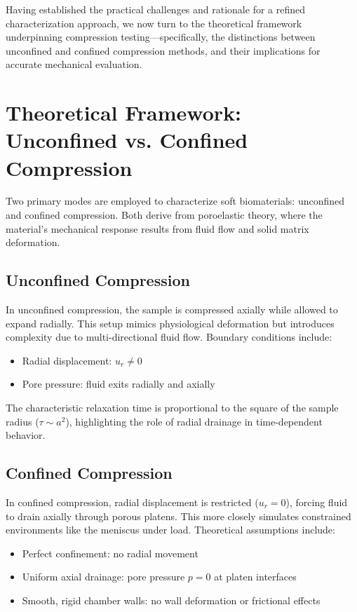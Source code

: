 Having established the practical challenges and rationale for a refined characterization approach, we now turn to the theoretical framework underpinning compression testing—specifically, the distinctions between unconfined and confined compression methods, and their implications for accurate mechanical evaluation.

\section{Theoretical Framework: Unconfined vs. Confined Compression}

Two primary modes are employed to characterize soft biomaterials: unconfined and confined compression. Both derive from poroelastic theory, where the material's mechanical response results from fluid flow and solid matrix deformation.

\subsection{Unconfined Compression}

In unconfined compression, the sample is compressed axially while allowed to expand radially. This setup mimics physiological deformation but introduces complexity due to multi-directional fluid flow. Boundary conditions include:
\begin{itemize}
    \item Radial displacement: $u_r \neq 0$
    \item Pore pressure: fluid exits radially and axially
\end{itemize}

The characteristic relaxation time is proportional to the square of the sample radius ($\tau \sim a^2$), highlighting the role of radial drainage in time-dependent behavior.

\subsection{Confined Compression}

In confined compression, radial displacement is restricted ($u_r = 0$), forcing fluid to drain axially through porous platens. This more closely simulates constrained environments like the meniscus under load. Theoretical assumptions include:

\begin{itemize}
    \item Perfect confinement: no radial movement
    \item Uniform axial drainage: pore pressure $p = 0$ at platen interfaces
    \item Smooth, rigid chamber walls: no wall deformation or frictional effects
\end{itemize}

